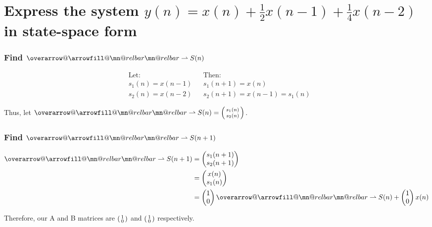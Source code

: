 \documentclass{article}
\makeatletter
\renewcommand{\thesubsubsection}{\thesection.\alph{subsection}.\Roman{subsubsection}}
\DeclareRobustCommand{\overrightharpoon}{\mathpalette{\overarrow@\rightharpoonfill@}}
\def\rightharpoonfill@{\arrowfill@\mn@relbar\mn@relbar\rightharpoonup}
\makeatother
\begin{document}
\section{Express the system $y(n) = x(n) + \frac{1}{2}x(n-1) + \frac{1}{4}x(n-2)$ in state-space form}

\makeatletter
\renewcommand\thesubsubsection{\thesection.\Roman{subsubsection}}
\makeatother

\subsubsection{Find $\overrightharpoon{S(n)}$}

\begin{align*}
	&\text{Let:} && \text{Then:} \\
	&s_1(n) = x(n-1) && s_1(n+1) = x(n) \\
	&s_2(n) = x(n-2) && s_2(n+1) = x(n-1) = s_1(n)
\end{align*}

Thus, let $\overrightharpoon{S(n)} = \begin{psmallmatrix} s_1(n) \\ s_2(n) \end{psmallmatrix}$.

\subsubsection{Find $\overrightharpoon{S(n+1)}$}

\begin{align*}
	\overrightharpoon{S(n+1)} &= \begin{pmatrix} s_1(n+1) \\ s_2(n+1) \end{pmatrix} \\
	&= \begin{pmatrix} x(n) \\ s_1(n) \end{pmatrix} \\
	&= \begin{pmatrix} 1 \\ 0 \end{pmatrix}\overrightharpoon{S(n)} + \begin{pmatrix} 1 \\ 0 \end{pmatrix}x(n)
\end{align*}

Therefore, our A and B matrices are $\begin{psmallmatrix} 1 \\ 0 \end{psmallmatrix}$ and $\begin{psmallmatrix} 1 \\ 0 \end{psmallmatrix}$ respectively.
\end{document}

